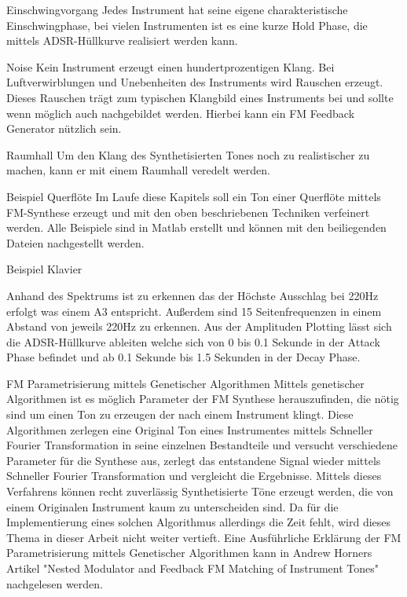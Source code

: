Einschwingvorgang
Jedes Instrument hat seine eigene charakteristische Einschwingphase, bei vielen Instrumenten ist es eine kurze Hold Phase, die mittels ADSR-Hüllkurve realisiert werden kann.

Noise
Kein Instrument erzeugt einen hundertprozentigen Klang. Bei Luftverwirblungen und Unebenheiten des Instruments wird Rauschen erzeugt. Dieses Rauschen trägt zum typischen Klangbild eines Instruments bei und sollte wenn möglich auch nachgebildet werden. Hierbei kann ein FM Feedback Generator nützlich sein.

Raumhall
Um den Klang des Synthetisierten Tones noch zu realistischer zu machen, kann er mit einem Raumhall veredelt werden.


Beispiel Querflöte
Im Laufe diese Kapitels soll ein Ton einer Querflöte mittels FM-Synthese erzeugt und mit den oben beschriebenen Techniken verfeinert werden. Alle Beispiele sind in Matlab erstellt und können mit den beiliegenden Dateien nachgestellt werden.






Beispiel Klavier

Anhand des Spektrums ist zu erkennen das der Höchste Ausschlag bei 220Hz erfolgt was einem A3 entspricht. Außerdem sind 15 Seitenfrequenzen in einem Abstand von jeweils 220Hz zu erkennen. Aus der Amplituden Plotting lässt sich die ADSR-Hüllkurve ableiten welche sich von 0 bis 0.1 Sekunde in der Attack Phase befindet und ab 0.1 Sekunde bis 1.5 Sekunden in der Decay Phase.



FM Parametrisierung mittels Genetischer Algorithmen
Mittels genetischer Algorithmen ist es möglich Parameter der FM Synthese herauszufinden, die nötig sind um einen Ton zu erzeugen der nach einem Instrument klingt. Diese Algorithmen zerlegen eine Original Ton eines Instrumentes mittels Schneller Fourier Transformation in seine einzelnen Bestandteile und versucht verschiedene Parameter für die Synthese aus, zerlegt das entstandene Signal wieder mittels Schneller Fourier Transformation und vergleicht die Ergebnisse. Mittels dieses Verfahrens können recht zuverlässig Synthetisierte Töne erzeugt werden, die von einem Originalen Instrument kaum zu unterscheiden sind. Da für die Implementierung eines solchen Algorithmus allerdings die Zeit fehlt, wird dieses Thema in dieser Arbeit nicht weiter vertieft. Eine Ausführliche Erklärung der FM Parametrisierung mittels Genetischer Algorithmen kann in Andrew Horners Artikel "Nested Modulator and Feedback FM Matching of Instrument Tones" nachgelesen werden.



